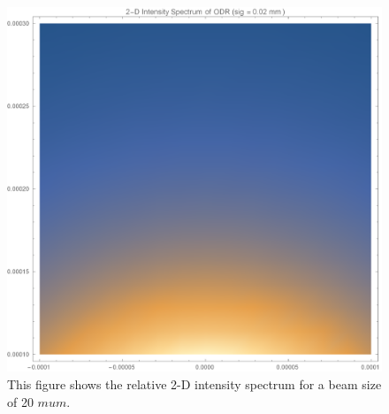 \documentclass[12pt]{article}
\begin{document}
\begin{figure}
\begin{center}
\includegraphics[scale=0.5]{figures/ODR_2D_Intensity.PDF}
\caption{This figure shows the relative 2-D intensity spectrum for a beam size of 20 $mu m$.}
\end{center}
\end{figure}
\end{document}

